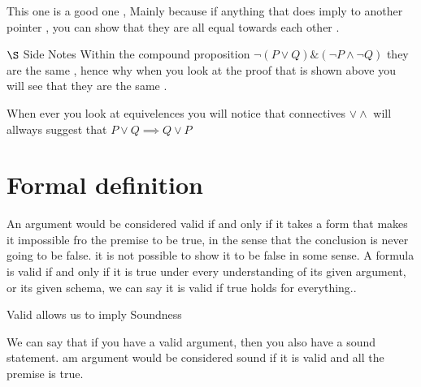 \documentclass{article}
\theoremstyle{mytheoremstyle}
\theoremstyle{mytheoremstyle}
\theoremstyle{myproblemstyle}
\begin{document}
This one is a good one , Mainly because if anything that does imply to another pointer , you can show that they are all equal towards each other .



\item $\S$ Side Notes
    Within the compound proposition $\neg(P \lor Q) \&  (\neg P \land \neg Q) $ they are the same , hence why when you look at the proof that is shown above you will see that they are the same .

When ever you look at equivelences you will notice that connectives $ \lor \land $ will allways suggest that $ P \lor Q \implies Q \lor P $

\newpage

\section{Formal definition }

\begin{definition}[Valid]
    An argument would be considered valid if and only if it takes a form that makes it impossible fro the premise to be true, in the sense that the conclusion is never going to be false. it is not possible to show it to be false in some sense.
        A formula is valid if and only if it is true under every understanding of its given argument, or its given schema, we can say it is valid if true holds for everything..
\end{definition}

\begin{definition}
    Valid allows us to imply Soundness

    We can say that if you have a valid argument, then you also have a sound statement.
    am argument would be considered sound if it is valid and all the premise is true.
\end{definition}
\end{document}
